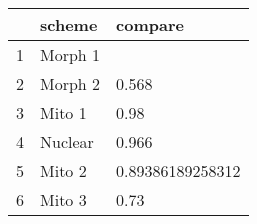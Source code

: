 \begin{table}[ht]
\centering
\begin{tabular}{rll}
  \hline
 & scheme & compare \\ 
  \hline
1 & Morph 1 &  \\ 
  2 & Morph 2 & 0.568 \\ 
  3 & Mito 1 & 0.98 \\ 
  4 & Nuclear & 0.966 \\ 
  5 & Mito 2 & 0.89386189258312 \\ 
  6 & Mito 3 & 0.73 \\ 
   \hline
\end{tabular}
\label{mmdif}
\end{table}

